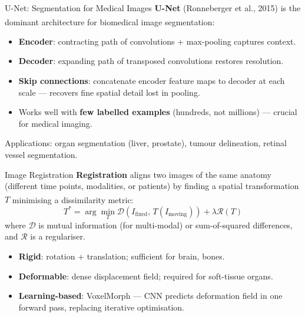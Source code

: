 \begin{v3topic}{U-Net: Segmentation for Medical Images}
    \textbf{U-Net} (Ronneberger et al., 2015) is the dominant architecture for biomedical image segmentation\textsuperscript{\cite[][p.~234]{ronnebergerUnetConvolutionalNetworks2015}}:
    \begin{itemize}
        \item \textbf{Encoder}: contracting path of convolutions + max-pooling captures context.
        \item \textbf{Decoder}: expanding path of transposed convolutions restores resolution.
        \item \textbf{Skip connections}: concatenate encoder feature maps to decoder at each scale — recovers fine spatial detail lost in pooling.
        \item Works well with \textbf{few labelled examples} (hundreds, not millions) — crucial for medical imaging.
    \end{itemize}
    Applications: organ segmentation (liver, prostate), tumour delineation, retinal vessel segmentation.

\end{v3topic}
\begin{v3topic}{Image Registration}
    \textbf{Registration} aligns two images of the same anatomy (different time points, modalities, or patients) by finding a spatial transformation $T$ minimising a dissimilarity metric\textsuperscript{\cite[][pp.~315--360]{schweikardMedicalRobotics2015}}:
    \begin{equation}
        T^* = \arg\min_T \mathcal{D}(I_\text{fixed},\, T(I_\text{moving})) + \lambda \mathcal{R}(T)
    \end{equation}
    where $\mathcal{D}$ is mutual information (for multi-modal) or sum-of-squared differences, and $\mathcal{R}$ is a regulariser.
    \begin{itemize}
        \item \textbf{Rigid}: rotation + translation; sufficient for brain, bones.
        \item \textbf{Deformable}: dense displacement field; required for soft-tissue organs.
        \item \textbf{Learning-based}: VoxelMorph — CNN predicts deformation field in one forward pass, replacing iterative optimisation.
    \end{itemize}
\end{v3topic}

